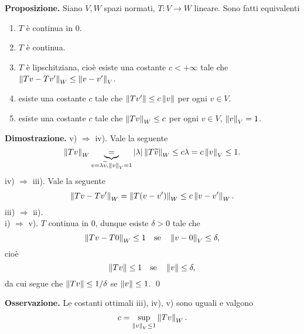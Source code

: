 \documentclass[a4paper, 12pt]{report}
\begin{document}
\textbf{Proposizione.} Siano $V,W$ spazi normati, $T \colon V \to W$ lineare.
Sono fatti equivalenti
\begin{enumerate}
\item $T$ è continua in $0$.

\item $T$ è continua.

\item $T$ è lipschitziana, cioè esiste una costante $c < +\infty$ tale che $\left\lVert Tv - Tv' \right\rVert_W \leq \left\lVert v - v' \right\rVert_V$.

\item esiste una costante $c$ tale che $\left\lVert Tv' \right\rVert \leq c \left\lVert v \right\rVert$ per ogni $v \in V$.

\item esiste una costante $c$ tale che $\left\lVert Tv \right\rVert_W \leq c$ per ogni $v \in V$, $\left\lVert v \right\rVert_V = 1$.
\end{enumerate}

\textbf{Dimostrazione.}
v) $\Rightarrow$ iv). Vale la seguente
%
$$
\left\lVert Tv \right\rVert_W \underbrace{=}_{v = \lambda \widetilde{v}, \left\lVert v \right\rVert_V = 1} \left| \lambda \right| \left\lVert T \widetilde{v} \right\rVert_W \leq c \lambda = c \left\lVert v \right\rVert_V \leq 1.
$$
%
iv) $\Rightarrow$ iii). Vale la seguente
%
$$
\left\lVert Tv - Tv' \right\rVert_W = \left\lVert T(v - v') \right\rVert_W \leq c \left\lVert v - v' \right\rVert_W.
$$
%
iii) $\Rightarrow$ ii). \\
i) $\Rightarrow$ v). $T$ continua in $0$, dunque esiste $\delta > 0$ tale che
%
$$
\left\lVert Tv - T0 \right\rVert_W \leq 1 \quad \text{se} \quad \left\lVert v - 0 \right\rVert_V \leq \delta,
$$
%
cioè
%
$$
\left\lVert Tv \right\rVert \leq 1 \quad \text{se} \quad \left\lVert v \right\rVert \leq \delta,
$$
%
da cui segue che $\left\lVert Tv \right\rVert \leq 1/ \delta$ se $\left\lVert v \right\rVert \leq 1$.
\qed

\textbf{Osservazione.} Le costanti ottimali iii), iv), v) sono uguali e valgono
%
$$
c = \sup_{\left\lVert v \right\rVert_V \leq 1} \left\lVert Tv \right\rVert_W.
$$
%
\end{document}
